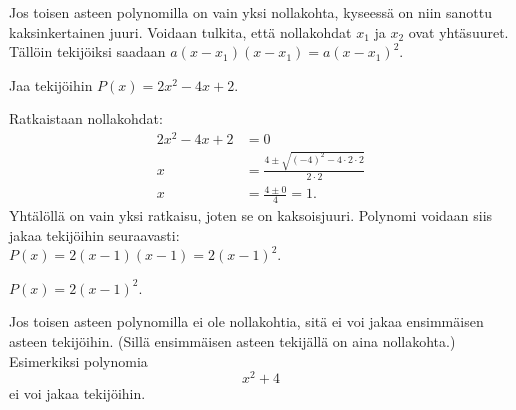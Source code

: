 Jos toisen asteen polynomilla on vain yksi nollakohta, kyseessä on niin sanottu kaksinkertainen juuri. Voidaan tulkita, että nollakohdat $x_1$ ja $x_2$ ovat yhtäsuuret. Tällöin tekijöiksi saadaan $a(x-x_1)(x-x_1)=a(x-x_1)^2$.

\begin{esimerkki}
Jaa tekijöihin $P(x)=2x^2-4x+2$.
\begin{esimratk}
Ratkaistaan nollakohdat:
\begin{align*}
2x^2-4x+2 &= 0	\\
x &= \frac{4\pm \sqrt{(-4)^2-4\cdot 2 \cdot 2}}{2\cdot 2} \\
x &= \frac{4 \pm 0}{4} = 1.
\end{align*}
Yhtälöllä on vain yksi ratkaisu, joten se on kaksoisjuuri.
Polynomi voidaan siis jakaa tekijöihin seuraavasti: \\ $P(x)=2(x-1)(x-1)=2(x-1)^2$. 
\end{esimratk}
\begin{esimvast}
$P(x)=2(x-1)^2$.
\end{esimvast}
\end{esimerkki}


Jos toisen asteen polynomilla ei ole nollakohtia, sitä ei voi jakaa ensimmäisen asteen tekijöihin. (Sillä ensimmäisen asteen tekijällä on aina nollakohta.) Esimerkiksi
polynomia $$x^2+4$$ ei voi jakaa tekijöihin.


